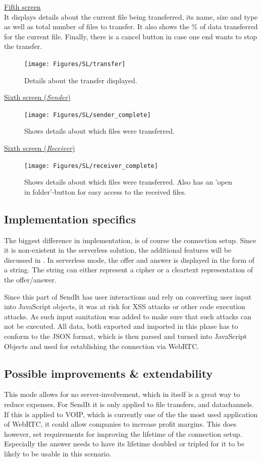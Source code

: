 %
\noindent
\underline{Fifth screen}\\
	It displays details about the current file being transferred, its name, size and type as well as total number of files to transfer. It also shows the \% of data transferred for the current file. Finally, there is a cancel button in case one end wants to stop the transfer.
\begin{figure}[H]
  \centering
  \texttt{[image: Figures/SL/transfer]}
  \decoRule
  \caption[Transfer screen]{Details about the transfer displayed. }
  \label{fig:SL_trans}
\end{figure}

%
\noindent
\underline{Sixth screen (\emph{Sender})}
\begin{figure}[H]
  \centering
  \texttt{[image: Figures/SL/sender\_complete]}
  \decoRule
  \caption[Final screen Sender]{Shows details about which files were transferred.}
  \label{fig:SL_rec1}
\end{figure}

%
\noindent
\underline{Sixth screen (\emph{Receiver})}
\begin{figure}[H]
  \centering
  \texttt{[image: Figures/SL/receiver\_complete]}
  \decoRule
  \caption[Final screen Receiver]{Shows details about which files were transferred. Also has an 'open in folder'-button for easy access to the received files.}
  \label{fig:SL_rec2}
\end{figure}

\subsection{Implementation specifics}
%
The biggest difference in implementation, is of course the connection setup. Since it is non-existent in the serverless solution, the additional features will be discussed in . In serverless mode, the offer and answer is displayed in the form of a string. The string can either represent a cipher or a cleartext representation of the offer/answer.

Since this part of SendIt has user interactions and rely on converting user input into JavaScript objects, it was at risk for XSS attacks or other code execution attacks. As such input sanitation was added to make sure that such attacks can not be executed. All data, both exported and imported in this phase has to conform to the JSON format, which is then parsed and turned into JavaScript Objects and used for establishing the connection via WebRTC.
%
\subsection{Possible improvements \& extendability}
%
This mode allows for no server-involvement, which in itself is a great way to reduce expenses. For SendIt it is only applied to file transfers, and datachannels. If this is applied to VOIP, which is currently one of the the most used application of WebRTC, it could allow companies to increase profit margins. This does however, set requirements for improving the lifetime of the connection setup. Especially the answer needs to have its lifetime doubled or tripled for it to be likely to be usable in this scenario.

